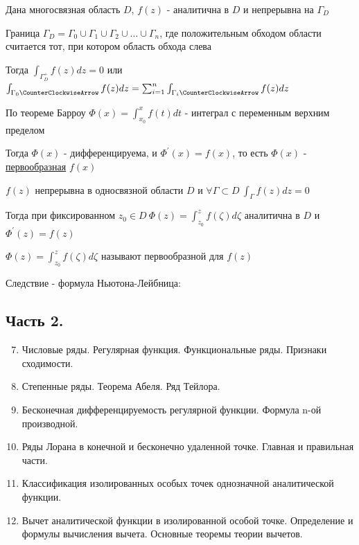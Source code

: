\documentclass[12pt]{article}
\begin{document}
\begin{enumerate}
    \begin{MyTheorem}
         Дана многосвязная область $D$, $f(z)$ - аналитична в $D$ и непрерывна на $\Gamma_D$
    
    
        Граница $\Gamma_D = \Gamma_0 \cup \Gamma_1 \cup \Gamma_2 \cup \dots \cup \Gamma_n$, где положительным обходом области
        считается тот, при котором область обхода слева
    
        Тогда $\int_{\Gamma_D^+} f(z) dz = 0$ или $\int_{\Gamma_0 \CounterClockwiseArrow} f(z) dz = \sum_{i = 1}^n \int_{\Gamma_i \CounterClockwiseArrow} f(z) dz$ 
    \end{MyTheorem}

    По теореме Барроу $\Phi(x) = \int_{x_0}^x f(t) dt$ - интеграл с переменным верхним пределом

    Тогда $\Phi(x)$ - дифференцируема, и $\Phi^\prime(x) = f(x)$, то есть $\Phi(x)$ - \hyperlink{antiderivative}{первообразная} $f(x)$

    \begin{MyTheorem}
        \Ths $f(z)$ непрерывна в односвязной области $D$ и $\forall \Gamma \subset D \ \int_\Gamma f(z) dz = 0$

        Тогда при фиксированном $z_0 \in D \ \Phi(z) = \int_{z_0}^z f(\zeta) d\zeta$ аналитична в $D$ и $\Phi^\prime(z) = f(z)$
    \end{MyTheorem}

    $\Phi(z) = \int_{z_0}^z f(\zeta) d\zeta$ называют первообразной для $f(z)$

    Следствие - формула Ньютона-Лейбница: 

    

\end{enumerate}

    

\subsection{Часть 2.}

\begin{enumerate}
    \setcounter{enumi}{6}

    \item Числовые ряды. Регулярная функция. Функциональные ряды. Признаки сходимости.
    \item Степенные ряды. Теорема Абеля. Ряд Тейлора.
    \item Бесконечная дифференцируемость регулярной функции. Формула n-ой производной.
    \item Ряды Лорана в конечной и бесконечно удаленной точке. Главная и правильная части.
    \item Классификация изолированных особых точек однозначной аналитической функции.
    \item Вычет аналитической функции в изолированной особой точке. Определение и формулы вычисления вычета. Основные теоремы теории вычетов.
\end{enumerate}
\end{document}
